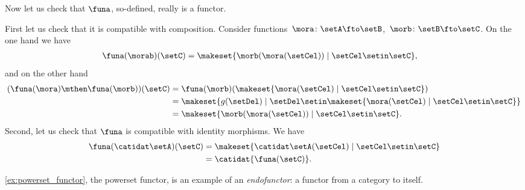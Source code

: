 \begin{example}
    Now let us check that $\funa$, so-defined, really is a functor.

    First let us check that it is compatible with composition.
    Consider functions~$\mora\colon \setA\fto \setB$,~$\morb\colon \setB \fto \setC$.
    On the one hand we have
    \begin{equation}\label{eq:powerset-functor-example-3}
        \begin{aligned}
            \funa(\morab)(\setC) & =\makeset{ \morb(\mora(\setCel))\mid \setCel \setin \setC},
        \end{aligned}
    \end{equation}
    and on the other hand
    \begin{equation}\label{eq:powerset-functor-example-4}
        \begin{aligned}
            (\funa(\mora)\mthen \funa(\morb))(\setC)
             & =\funa(\morb) (\makeset{ \mora(\setCel) \mid \setCel \setin \setC}) \\
             & =\makeset{g(\setDel)\mid \setDel \setin \makeset{\mora(\setCel)\mid \setCel\setin \setC}} \\
             & =\makeset{ \morb(\mora(\setCel))\mid \setCel \setin \setC}.
        \end{aligned}
    \end{equation}
    Second, let us check that $\funa$ is compatible with identity morphisms.
    We have
    \begin{equation}\label{eq:powerset-functor-example-5}
        \begin{aligned}
            \funa(\catidat\setA)(\setC) & = \makeset{\catidat\setA(\setCel)\mid \setCel \setin \setC} \\
                                        & =\catidat{\funa(\setC)}.
        \end{aligned}
    \end{equation}
\end{example}

\begin{remark}
\cref{ex:powerset_functor}, the powerset functor, is an example of an \emph{endofunctor}: a functor from a category to itself. 
\end{remark}

